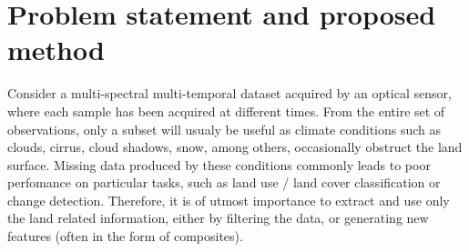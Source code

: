 \documentclass[journal,article,submit,pdftex,moreauthors]{Definitions/mdpi}
\begin{document}

\section{Problem statement and proposed method}
Consider a multi-spectral multi-temporal dataset acquired by an optical sensor, where each sample has been acquired at different times. From the entire set of observations, only a subset will usualy be useful as climate conditions such as clouds, cirrus, cloud shadows, snow, among others, occasionally obstruct the land surface. 
Missing data produced by these conditions commonly leads to poor perfomance on particular tasks, such as land use / land cover classification or change detection.
Therefore, it is of utmost importance to extract and  use only the land related information, either by filtering the data, or generating new features (often in the form of composites).
\end{document}
